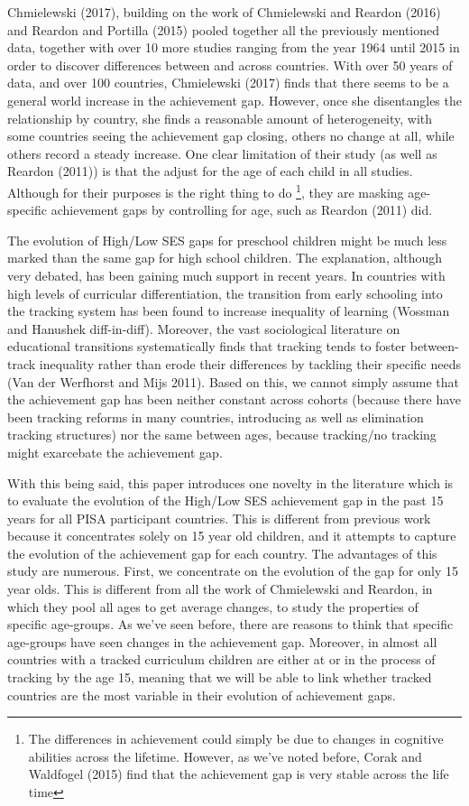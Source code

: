\documentclass[11pt, a4paper]{article}\usepackage[]{graphicx}\usepackage[]{color}
\begin{document}
Chmielewski (2017), building on the work of Chmielewski and Reardon (2016) and Reardon and Portilla (2015) pooled together all the previously mentioned data, together with over 10 more studies ranging from the year 1964 until 2015 in order to discover differences between and across countries. With over 50 years of data, and over 100 countries, Chmielewski (2017) finds that there seems to be a general world increase in the achievement gap. However, once she disentangles the relationship by country, she finds a reasonable amount of heterogeneity, with some countries seeing the achievement gap closing, others no change at all, while others record a steady increase. One clear limitation of their study (as well as Reardon (2011)) is that the adjust for the age of each child in all studies. Although for their purposes is the right thing to do \footnote{The differences in achievement could simply be due to changes in cognitive abilities across the lifetime. However, as we've noted before, Corak and Waldfogel (2015) find that the achievement gap is very stable across the life time}, they are masking age-specific achievement gaps by controlling for age, such as Reardon (2011) did.

The evolution of High/Low SES gaps for preschool children might be much less marked than the same gap for high school children. The explanation, although very debated, has been gaining much support in recent years. In countries with high levels of curricular differentiation, the transition from early schooling into the tracking system has been found to increase inequality of learning (Wossman and Hanushek diff-in-diff). Moreover, the vast sociological literature on educational transitions systematically finds that tracking tends to foster between-track inequality rather than erode their differences by tackling their specific needs (Van der Werfhorst and Mijs 2011). Based on this, we cannot simply assume that the achievement gap has been neither constant across cohorts (because there have been tracking reforms in many countries, introducing as well as elimination tracking structures) nor the same between ages, because tracking/no tracking might exarcebate the achievement gap.

With this being said, this paper introduces one novelty in the literature which is to evaluate the evolution of the High/Low SES achievement gap in the past 15 years for all PISA participant countries. This is different from previous work because it concentrates solely on 15 year old children, and it attempts to capture the evolution of the achievement gap for each country. The advantages of this study are numerous. First, we concentrate on the evolution of the gap for only 15 year olds. This is different from all the work of Chmielewski and Reardon, in which they pool all ages to get average changes, to study the properties of specific age-groups. As we've seen before, there are reasons to think that specific age-groups have seen changes in the achievement gap. Moreover, in almost all countries with a tracked curriculum children are either at or in the process of tracking by the age 15, meaning that we will be able to link whether tracked countries are the most variable in their evolution of achievement gaps.
\end{document}
